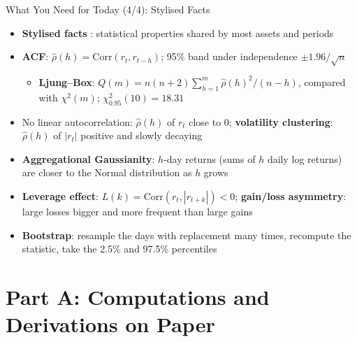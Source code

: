 \begin{frame}{What You Need for Today (4/4): Stylised Facts}
\itemsize{\footnotesize}
\begin{itemize}
    \item \textbf{Stylised facts} : statistical properties shared by most assets and periods
    \item \textbf{ACF}: $\hat\rho(h) = \text{Corr}(r_t, r_{t-h})$; 95\% band under independence $\pm 1.96/\sqrt n$
    \begin{itemize}
        \item \textbf{Ljung--Box}: $Q(m) = n(n+2)\sum_{h=1}^m \hat\rho(h)^2/(n-h)$, compared with $\chi^2(m)$; $\chi^2_{0.95}(10) = 18.31$
    \end{itemize}
    \item No linear autocorrelation: $\hat\rho(h)$ of $r_t$ close to 0; \textbf{volatility clustering}: $\hat\rho(h)$ of $|r_t|$ positive and slowly decaying
    \item \textbf{Aggregational Gaussianity}: $h$-day returns (sums of $h$ daily log returns) are closer to the Normal distribution as $h$ grows
    \item \textbf{Leverage effect}: $L(k) = \text{Corr}(r_t, |r_{t+k}|) < 0$; \textbf{gain/loss asymmetry}: large losses bigger and more frequent than large gains
    \item \textbf{Bootstrap}: resample the days with replacement many times, recompute the statistic, take the 2.5\% and 97.5\% percentiles
\end{itemize}
\end{frame}


\section{Part A: Computations and Derivations on Paper}

